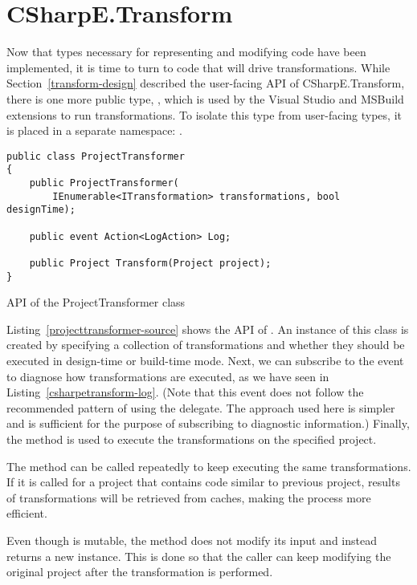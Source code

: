 \section{CSharpE.Transform}

Now that types necessary for representing and modifying code have been implemented, it is time to turn to code that will drive transformations. While Section~\ref{transform-design} described the user-facing \ac{API} of CSharpE.Transform, there is one more public type, , which is used by the Visual Studio and MSBuild extensions to run transformations. To isolate this type from user-facing types, it is placed in a separate namespace: .

\begin{listing}
\begin{verbatim}
public class ProjectTransformer
{
    public ProjectTransformer(
        IEnumerable<ITransformation> transformations, bool designTime);

    public event Action<LogAction> Log;

    public Project Transform(Project project);
}
\end{verbatim}
\caption{API of the ProjectTransformer class}
\label{projecttransformer-source}
\end{listing}

Listing~\ref{projecttransformer-source} shows the \ac{API} of . An instance of this class is created by specifying a collection of transformations and whether they should be executed in design-time or build-time mode. Next, we can subscribe to the  event to diagnose how transformations are executed, as we have seen in Listing~\ref{csharpetransform-log}. (Note that this event does not follow the recommended pattern of using the  delegate. \cite{fdg-events} The approach used here is simpler and is sufficient for the purpose of subscribing to diagnostic information.) Finally, the  method is used to execute the transformations on the specified project.

The  method can be called repeatedly to keep executing the same transformations. If it is called for a project that contains code similar to previous project, results of transformations will be retrieved from caches, making the process more efficient.

Even though  is mutable, the method does not modify its input and instead returns a new  instance. This is done so that the caller can keep modifying the original project after the transformation is performed.

